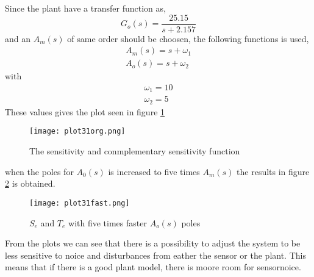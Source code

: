 Since the plant have a transfer function as,
\begin{equation}
  G_o(s)=\frac{25.15}{s+2.157}
\end{equation}
and an $A_m(s)$ of same order should be choosen, the following functions is
used,
\begin{align*}
    A_m(s)=s+\omega_1 \\
    A_o(s)=s+\omega_2
\end{align*}
with
\begin{align*}
    \omega_1 = 10 \\
    \omega_2 = 5
\end{align*}
These values gives the plot seen in figure \ref{fig:sens31org}
\begin{figure}[H]
  \centering
  \texttt{[image: plot31org.png]}
  \caption{The sensitivity and conmplementary sensitivity function}
  \label{fig:sens31org}
\end{figure}
when the poles for $A_0(s)$ is increased to five times $A_m(s)$ the
results in figure \ref{fig:sens31fast} is obtained. 
\begin{figure}[H]
    \centering
    \texttt{[image: plot31fast.png]}
    \caption{$S_e$ and $T_e$ with five times faster $A_o(s)$ poles}
    \label{fig:sens31fast}
\end{figure}
From the plots we can see that there is a possibility to adjust the
system to be less sensitive to noice and disturbances from eather the
sensor or the plant. This means that if there is a good plant model,
there is moore room for sensornoice.
